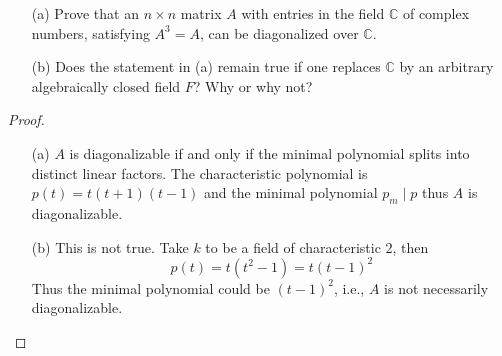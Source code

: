 \begin{prob}[S2001-Q5]
    \phantom{text}
    \begin{itemize}
        \item[(a)] Prove that an \( n \times n \) matrix \( A \) with entries in the field \( \mathbb{C} \) of complex numbers, satisfying \( A^3 = A \), can be diagonalized over \( \mathbb{C} \).
        
        \item[(b)] Does the statement in (a) remain true if one replaces \( \mathbb{C} \) by an arbitrary algebraically closed field \( F \)? Why or why not?
    \end{itemize}
\end{prob}
\begin{proof}
    \begin{itemize}
        \item[(a)] $A$ is diagonalizable if and only if the minimal polynomial splits into distinct linear factors. The characteristic polynomial is $p(t)=t(t+1)(t-1)$ and the minimal polynomial $p_m\mid p$ thus $A$ is diagonalizable.
        \item[(b)] This is not true. Take $k$ to be a field of characteristic $2$, then 
        \begin{equation*}
            p(t)=t(t^2-1)=t(t-1)^2
        \end{equation*}
        Thus the minimal polynomial could be $(t-1)^2$, i.e., $A$ is not necessarily diagonalizable.
    \end{itemize}
\end{proof}




